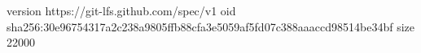 version https://git-lfs.github.com/spec/v1
oid sha256:30e96754317a2c238a9805ffb88cfa3e5059af5fd07c388aaaccd98514be34bf
size 22000
